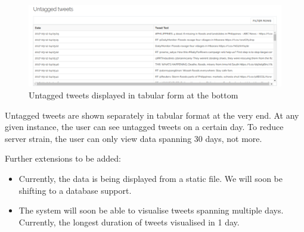 \documentclass[journal, a4paper]{IEEEtran}
\begin{document}
\begin{figure}[h!]
\centering
\includegraphics[width=\columnwidth]{untagged.png}
\caption{Untagged tweets displayed in tabular form at the bottom}
\label{fig:untagged}
\end{figure}

Untagged tweets are shown separately in tabular format at the very end. At any given instance, the user can see untagged tweets on a certain day. To reduce server strain, the user can only view data spanning 30 days, not more.

Further extensions to be added:
\begin{itemize}
    \item Currently, the data is being displayed from a static file. We will soon be shifting to a database support.
    \item The system will soon be able to visualise tweets spanning multiple days. Currently, the longest duration of tweets visualised in 1 day.
\end{itemize}
\end{document}
